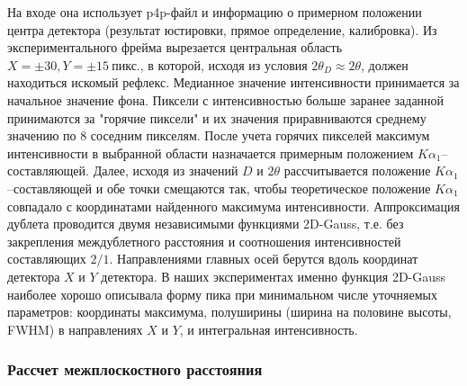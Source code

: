 \documentclass[a4paper, 12pt]{article}
\begin{document}
На входе она использует p4p-файл и информацию о примерном положении центра детектора (результат юстировки, прямое определение, калибровка).
Из экспериментального фрейма вырезается центральная область $X = \pm 30, Y = \pm 15 \ \text{пикс.}$, в которой, исходя из условия $2\theta_D \approx 2\theta$, должен находиться искомый рефлекс.
Медианное значение интенсивности принимается за начальное значение фона.
Пиксели с интенсивностью больше заранее заданной принимаются за "горячие пиксели" и их значения приравниваются среднему значению по 8 соседним пикселям.
После учета горячих пикселей максимум интенсивности в выбранной области назначается примерным положением $K\alpha_1$--составляющей.
Далее, исходя из значений $D$ и $2\theta$ рассчитывается положение $K\alpha_1$--составляющей и обе точки смещаются так, чтобы теоретическое положение $K\alpha_1$ совпадало с координатами найденного максимума интенсивности.
Аппроксимация дублета проводится двумя независимыми  функциями 2D-Gauss, т.е. без закрепления междублетного расстояния и соотношения интенсивностей составляющих $2/1$.
Направлениями главных осей берутся вдоль координат детектора $X$ и $Y$ детектора.
В наших экспериментах именно функция 2D-Gauss наиболее хорошо описывала форму пика при минимальном числе уточняемых параметров: координаты максимума, полуширины (ширина на половине высоты, FWHM) в направлениях $X$ и $Y$, и интегральная интенсивность.
\subsubsection{Рассчет межплоскостного расстояния}

\newpage


\end{document}
